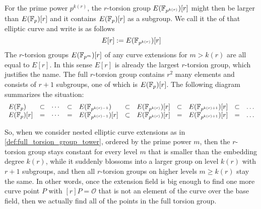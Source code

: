 For the prime power $p^{k(r)}$, the $r$-torsion group $E(\mathbb{F}_{p^{k(r)}})[r]$ might then be larger than $E(\mathbb{F}_p)[r]$ and it contains $E(\mathbb{F}_p)[r]$ as a subgroup. We call it the  of that elliptic curve and write is as follows
\begin{equation}
\label{def:full_torsion_group}
E[r] := E(\mathbb{F}_{p^{k(r)}})[r]
\end{equation}
The $r$-torsion groups $E(\mathbb{F}_{p^m})[r]$ of any curve extensions for $m>k(r)$ are all equal to $E[r]$. In this sense $E[r]$ is already the largest $r$-torsion group, which justifies the name. The full $r$-torsion group contains $r^2$ many elements and consists of $r+1$ subgroups, one of which is $E(\mathbb{F}_{p})[r]$. The following diagram summarizes the situation:
\begin{equation}
\label{def:full_torsion_group_tower}
\begin{array}{lccclclclcl}
E(\mathbb{F}_{p}) & \subset & \cdots  & \subset & E(\mathbb{F}_{p^{k(r)-1}}) & \subset & E(\mathbb{F}_{p^{k(r)}})[r] & \subset & E(\mathbb{F}_{p^{k(r)+1}})[r] & \subset & \ldots\\
E(\mathbb{F}_{p})[r] & = & \cdots  & = & E(\mathbb{F}_{p^{k(r)-1}})[r] & \subset & E(\mathbb{F}_{p^{k(r)}})[r] & = & 
E(\mathbb{F}_{p^{k(r)+1}})[r] & = & \ldots
\end{array}
\end{equation}

So, when we consider nested elliptic curve extensions as in \ref{def:full_torsion_group_tower}, ordered by the prime power $m$, then the $r$-torsion group stays constant for every level $m$ that is smaller than the embedding degree $k(r)$, while it suddenly blossoms into a larger group on level $k(r)$ with $r+1$ subgroups, and then all $r$-torsion groups on higher levels $m\geq k(r)$ stay the same. In other words, once the extension field is big enough to find one more curve point $P$ with $[r]P=\mathcal{O}$ that is not an element of the curve over the base field, then we actually find all of the points in the full torsion group.

